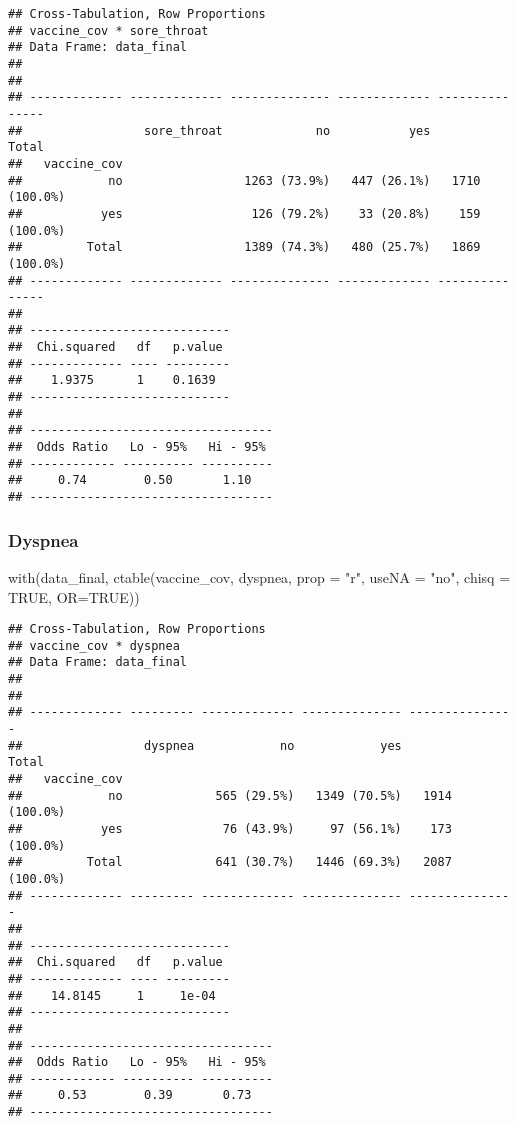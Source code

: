 \documentclass[
]{article}
\newenvironment{Shaded}{\begin{snugshade}}{\end{snugshade}}
\newcommand{\AttributeTok}[1]{\textcolor[rgb]{0.77,0.63,0.00}{#1}}
\newcommand{\ConstantTok}[1]{\textcolor[rgb]{0.00,0.00,0.00}{#1}}
\newcommand{\FunctionTok}[1]{\textcolor[rgb]{0.00,0.00,0.00}{#1}}
\newcommand{\NormalTok}[1]{#1}
\newcommand{\StringTok}[1]{\textcolor[rgb]{0.31,0.60,0.02}{#1}}
\begin{document}
\begin{verbatim}
## Cross-Tabulation, Row Proportions  
## vaccine_cov * sore_throat  
## Data Frame: data_final  
## 
## 
## ------------- ------------- -------------- ------------- ---------------
##                 sore_throat             no           yes           Total
##   vaccine_cov                                                           
##            no                 1263 (73.9%)   447 (26.1%)   1710 (100.0%)
##           yes                  126 (79.2%)    33 (20.8%)    159 (100.0%)
##         Total                 1389 (74.3%)   480 (25.7%)   1869 (100.0%)
## ------------- ------------- -------------- ------------- ---------------
## 
## ----------------------------
##  Chi.squared   df   p.value 
## ------------- ---- ---------
##    1.9375      1    0.1639  
## ----------------------------
## 
## ----------------------------------
##  Odds Ratio   Lo - 95%   Hi - 95% 
## ------------ ---------- ----------
##     0.74        0.50       1.10   
## ----------------------------------
\end{verbatim}

\hypertarget{dyspnea}{%
\subsubsection{Dyspnea}\label{dyspnea}}

\begin{Shaded}
\begin{Highlighting}[]
\FunctionTok{with}\NormalTok{(data\_final, }\FunctionTok{ctable}\NormalTok{(vaccine\_cov, dyspnea, }\AttributeTok{prop =} \StringTok{"r"}\NormalTok{, }\AttributeTok{useNA =} \StringTok{"no"}\NormalTok{, }\AttributeTok{chisq =} \ConstantTok{TRUE}\NormalTok{, }\AttributeTok{OR=}\ConstantTok{TRUE}\NormalTok{))}
\end{Highlighting}
\end{Shaded}

\begin{verbatim}
## Cross-Tabulation, Row Proportions  
## vaccine_cov * dyspnea  
## Data Frame: data_final  
## 
## 
## ------------- --------- ------------- -------------- ---------------
##                 dyspnea            no            yes           Total
##   vaccine_cov                                                       
##            no             565 (29.5%)   1349 (70.5%)   1914 (100.0%)
##           yes              76 (43.9%)     97 (56.1%)    173 (100.0%)
##         Total             641 (30.7%)   1446 (69.3%)   2087 (100.0%)
## ------------- --------- ------------- -------------- ---------------
## 
## ----------------------------
##  Chi.squared   df   p.value 
## ------------- ---- ---------
##    14.8145     1     1e-04  
## ----------------------------
## 
## ----------------------------------
##  Odds Ratio   Lo - 95%   Hi - 95% 
## ------------ ---------- ----------
##     0.53        0.39       0.73   
## ----------------------------------
\end{verbatim}
\end{document}
